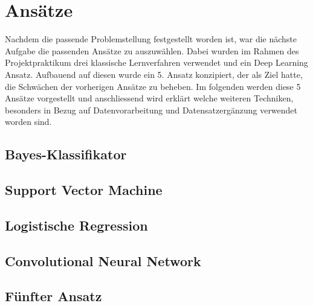 \documentclass[researchlab,palatino]{AIGpaper}
\begin{document}
\section{Ansätze}
\label{Ansätze}
Nachdem die passende Problemstellung festgestellt worden ist, war die nächste Aufgabe die passenden Ansätze zu auszuwählen. Dabei wurden im Rahmen des Projektpraktikum drei klassische Lernverfahren verwendet und ein Deep Learning Ansatz. Aufbauend auf diesen wurde ein 5. Ansatz konzipiert, der als Ziel hatte, die Schwächen der vorherigen Ansätze zu beheben. Im folgenden werden diese 5 Ansätze vorgestellt und anschliessend wird erklärt welche weiteren Techniken, besonders in Bezug auf Datenvorarbeitung und Datensatzergänzung verwendet worden sind.

\subsection{Bayes-Klassifikator}
\label{sec:Bayes-Klassifikator}


\subsection{Support Vector Machine}
\label{SVM}


\subsection{Logistische Regression}
\label{Logistische Regression}


\subsection{Convolutional Neural Network}
\label{CNN}


\subsection{Fünfter Ansatz}
\label{Transformer}
\end{document}

